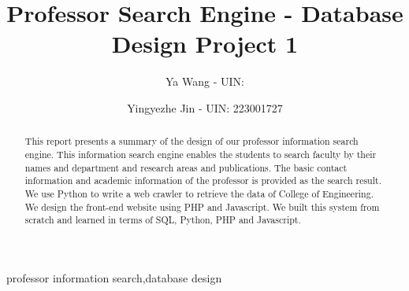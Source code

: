 \documentclass[authoryear,preprint,final,12pt]{elsarticle}
\begin{document}
\begin{frontmatter}




\title{Professor Search Engine - Database Design Project 1}


\author{Ya Wang - UIN: }

\author{Yingyezhe Jin - UIN: 223001727}


\address{Department of Electrical and Computer Engineering,\\
Texas A\&M University,
College Station, TX 77843, United States}

\begin{abstract}
This report presents a summary of the design of our professor information search engine. This information search engine enables the students to search faculty by their names and department and research areas and publications. The basic contact information and academic information of the professor is provided as the search result. We use Python to write a web crawler to retrieve the data of College of Engineering. We design the front-end website using PHP and Javascript. We built this system from scratch and learned in terms of SQL, Python, PHP and Javascript.
\end{abstract}

\begin{keyword}
professor information search\sep database design


\end{keyword}

\end{frontmatter}
\end{document}
